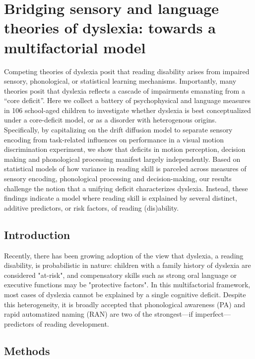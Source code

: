 \documentclass[../uwthesis.tex]{subfiles}
\begin{document}
\chapter{Bridging sensory and language theories of dyslexia: towards a multifactorial model}

Competing theories of dyslexia posit that reading disability arises from impaired sensory, phonological, or statistical learning mechanisms. Importantly, many theories posit that dyslexia reflects a cascade of impairments emanating from a “core deficit”. Here we collect a battery of psychophysical and language measures in 106 school-aged children to investigate whether dyslexia is best conceptualized under a core-deficit model, or as a disorder with heterogenous origins. Specifically, by capitalizing on the drift diffusion model to separate sensory encoding from task-related influences on performance in a visual motion discrimination experiment, we show that deficits in motion perception, decision making and phonological processing manifest largely independently. Based on statistical models of how variance in reading skill is parceled across measures of sensory encoding, phonological processing and decision-making, our results challenge the notion that a unifying deficit characterizes dyslexia. Instead, these findings indicate a model where reading skill is explained by several distinct, additive predictors, or risk factors, of reading (dis)ability. 

\section{Introduction}
Recently, there has been growing adoption of the view that dyslexia, a reading disability, is probabilistic in nature: children with a family history of dyslexia are considered "at-risk", and compensatory skills such as strong oral language or executive functions may be "protective factors". In this multifactorial framework, most cases of dyslexia cannot be explained by a single cognitive deficit. Despite this heterogeneity, it is broadly accepted that phonological awareness (PA) and rapid automatized naming (RAN) are two of the strongest---if imperfect---predictors of reading development. 

\section{Methods}
\end{document}
